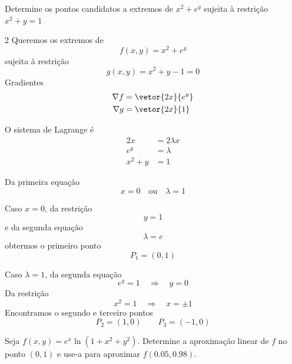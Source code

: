 \documentclass[a4paper,12pt,fleqn]{article}
\begin{document}

Determine os pontos candidatos a extremos de
\(
  x^2+e^{y}
\)
sujeita à restrição
\(
  x^2+y=1
\)

\begin{answer}
\begin{multicols}{2}
Queremos os extremos de
\[
  f(x, y) = x^2 + e^{y}
\]
sujeita à restrição
\[
  g(x, y) = x^2 + y - 1 = 0
\]
Gradientes
\begin{align*}
  \nabla f & = \vetor{2x}{e^{y}} \\
  \nabla g & = \vetor{2x}{1}
\end{align*}

O sistema de Lagrange é
\begin{align*}
  2x    & =2\lambda x \\
  e^{y} & =\lambda    \\
  x^2+y & =1
\end{align*}

Da primeira equação
\[
  x = 0 \quad \text{ou} \quad \lambda=1
\]

Caso $x=0$, da restrição
\[
  y = 1
\]
e da segunda equação
\[
  \lambda = e
\]
obtermos o primeiro ponto
\[
  P_1 = (0, 1)
\]

Caso $\lambda=1$, da segunda equação
\[
  e^{y}=1 \quad\Rightarrow\quad y=0
\]
Da restrição
\[
x^2=1 \quad\Rightarrow\quad x=\pm1
\]
Encontramos o segundo e terceiro pontos
\[
P_2 = (1, 0) \qquad P_3 = (-1, 0)
\]
\end{multicols}
\end{answer}

Seja \(f(x,y)=e^{x}\ln(1+x^{2}+y^{2})\). Determine a
aproximação linear de \(f\) no ponto \((0, 1)\) e use-a para aproximar
\(f(0.05, 0.98)\).
\end{document}
